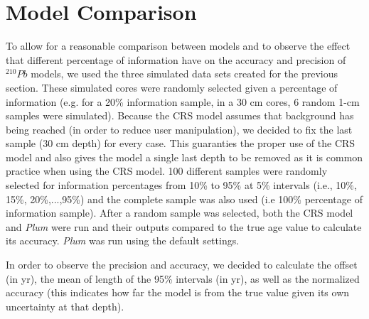 \documentclass [10pt] {article}
\begin{document}
\section{Model Comparison}

To allow for a reasonable comparison between models and to observe the effect that different percentage of information have on the accuracy and precision of $^{210}Pb$ models, we used the three simulated data sets created for the previous section. 
These simulated cores were randomly selected given a percentage of information (e.g. for a 20\% information sample, in a 30 cm cores, 6 random 1-cm samples were simulated). 
Because the CRS model assumes that background has being reached (in order to reduce user manipulation), we decided to fix the last sample (30 cm depth) for every case.
This guaranties the proper use of the CRS model and also gives the model a single last depth to be removed as it is common practice when using the CRS model.
100 different samples were randomly selected for information percentages from 10\% to 95\% at 5\% intervals (i.e., 10\%, 15\%, 20\%,...,95\%)  and the complete sample was also used (i.e 100\% percentage of information sample).
After a random sample was selected, both the CRS model and \textit{Plum} were run and their outputs compared to the true age value to calculate its accuracy.
\textit{Plum} was run using the default settings.

In order to observe the precision and accuracy, we decided to calculate the offset (in yr), the mean of length of the 95\% intervals (in yr), as well as the normalized accuracy (this indicates how far the model is from the true value given its own uncertainty at that depth).  
\end{document}
